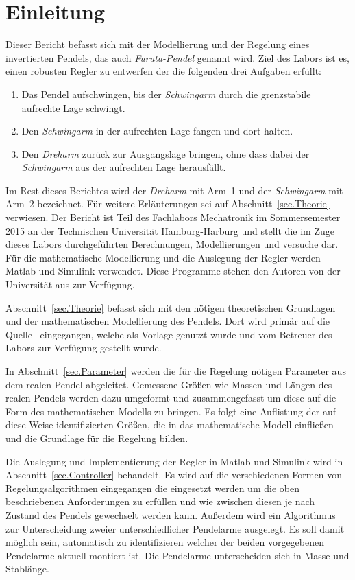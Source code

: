 \section{Einleitung}
\label{sec.Einleitung}

Dieser Bericht befasst sich mit der Modellierung und der Regelung eines invertierten Pendels, das auch \emph{Furuta-Pendel} genannt wird. 
Ziel des Labors ist es, einen robusten Regler zu entwerfen der die folgenden drei Aufgaben erfüllt:
\begin{enumerate}
	\raggedright
	\item Das Pendel aufschwingen, bis der \emph{Schwingarm} durch die grenzstabile aufrechte Lage schwingt.
	\item Den \emph{Schwingarm} in der aufrechten Lage fangen und dort halten.
	\item Den \emph{Dreharm} zurück zur Ausgangslage bringen, ohne dass dabei der \emph{Schwingarm} aus der aufrechten Lage herausfällt.
\end{enumerate}
Im Rest dieses Berichtes wird der \emph{Dreharm} mit Arm~1 und der \emph{Schwingarm} mit Arm~2 bezeichnet.
Für weitere Erläuterungen sei auf Abschnitt~\ref{sec.Theorie} verwiesen.
Der Bericht ist Teil des Fachlabors Mechatronik im Sommersemester 2015 an der Technischen Universität Hamburg-Harburg und stellt die im Zuge dieses Labors durchgeführten Berechnungen, Modellierungen und versuche dar. 
Für die mathematische Modellierung und die Auslegung der Regler werden Matlab und Simulink verwendet.
Diese Programme stehen den Autoren von der Universität aus zur Verfügung.

Abschnitt~\ref{sec.Theorie} befasst sich mit den nötigen theoretischen Grundlagen und der mathematischen Modellierung des Pendels.
Dort wird primär auf die Quelle~\citep{Cazzolato.2011} eingegangen, welche als Vorlage genutzt wurde und vom Betreuer des Labors zur Verfügung gestellt wurde.

In Abschnitt~\ref{sec.Parameter} werden die für die Regelung nötigen Parameter aus dem realen Pendel abgeleitet. 
Gemessene Größen wie Massen und Längen des realen Pendels werden dazu umgeformt und zusammengefasst um diese auf die Form des mathematischen Modells zu bringen.
Es folgt eine Auflistung der auf diese Weise identifizierten Größen, die in das mathematische Modell einfließen und die Grundlage für die Regelung bilden.

Die Auslegung und Implementierung der Regler in Matlab und Simulink wird in Abschnitt~\ref{sec.Controller} behandelt.
Es wird auf die verschiedenen Formen von Regelungsalgorithmen eingegangen die eingesetzt werden um die oben beschriebenen Anforderungen zu erfüllen und wie zwischen diesen je nach Zustand des Pendels gewechselt werden kann.
Außerdem wird ein Algorithmus zur Unterscheidung zweier unterschiedlicher Pendelarme ausgelegt. 
Es soll damit möglich sein, automatisch zu identifizieren welcher der beiden vorgegebenen Pendelarme aktuell montiert ist. 
Die Pendelarme unterscheiden sich in Masse und Stablänge.

